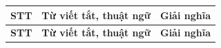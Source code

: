
\begin{longtable}{
    >{\centering\arraybackslash}p{1.2cm}
    >{\centering\arraybackslash}p{3.2cm}
    >{\raggedright\arraybackslash}p{9cm}
}
    \toprule
    \textbf{STT}
    & \textbf{Từ viết tắt, thuật ngữ}
    & \textbf{Giải nghĩa} \\
    \midrule
    \endfirsthead

    \toprule
    \textbf{STT}
    & \textbf{Từ viết tắt, thuật ngữ}
    & \textbf{Giải nghĩa} \\
    \midrule
    \endhead


\end{longtable}
